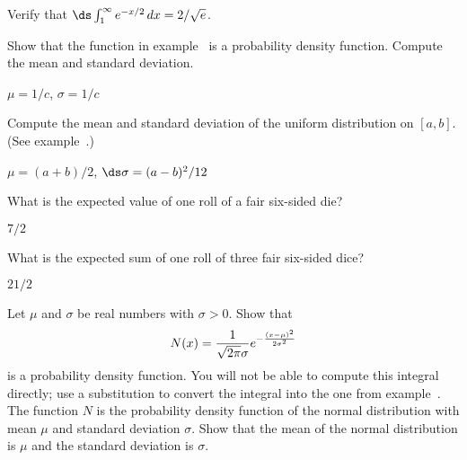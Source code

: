 \begin{exercises}

\begin{exercise} Verify that $\ds \int_1^\infty e^{-x/2}\,dx=2/\sqrt{e}$.

\begin{exercise} Show that the function in example~ is a probability density function. Compute the mean
and standard deviation.
\begin{answer} $\mu=1/c$, $\sigma=1/c$
\end{answer}\end{exercise}

\begin{exercise} Compute the mean and standard deviation of the uniform distribution
on $[a,b]$. (See example~.)
\begin{answer} $\mu=(a+b)/2$, $\ds\sigma=(a-b)^2/12$
\end{answer}\end{exercise}

\begin{exercise} What is the expected value of one roll of a fair
six-sided die?
\begin{answer} $7/2$
\end{answer}\end{exercise}

\begin{exercise} What is the expected sum of one roll of three fair
six-sided dice? 
\begin{answer} $21/2$
\end{answer}\end{exercise}


\begin{exercise} Let $\mu$ and $\sigma$ be real numbers with $\sigma
>0$. Show that
$$N(x) = {1\over\sqrt{2\pi} \sigma} e^{-{(x-\mu)^2\over 2\sigma^2}}$$
is a probability density function.  You will not be able to compute
this integral directly; use a substitution to convert the integral
into the one from example~.
The function $N$ is the probability density function of the
{\dfont normal distribution\/} 
with mean $\mu$ and standard deviation
$\sigma$. Show that the mean of the normal distribution is $\mu$ and
the standard deviation is $\sigma$.


\end{exercise}
\end{exercise}
\end{exercises}
